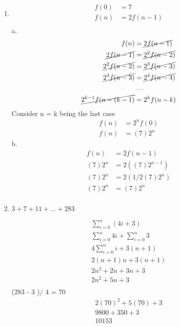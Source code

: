 \documentclass{article}
\begin{document}
\begin{enumerate}
  \item
    \begin{align*}
      f(0) &= 7 \\
      f(n) &= 2f(n - 1) \\
    \end{align*}
    a.
    \begin{align*}
    f(n) &= \cancel{2f(n-1)}\\
    \cancel{2f(n-1)} &= \cancel{2^2f(n-2)}\\
    \cancel{2^2f(n-2)} &= \cancel{2^3f(n-3)}\\
    \cancel{2^3f(n-3)} &= \cancel{2^4f(n-4)}\\
    &\ldots\\
    \cancel{2^{k-1}f(n-(k-1)} &= 2^{k}f(n-k)
  \end{align*}
  Consider n = k being the last case
  \begin{align*}
    f(n) &= 2^{n}f(0) \\
    f(n) &= (7)2^{n}
  \end{align*}
  b.
  \begin{align*}
    f(n) &= 2f(n - 1) \\
    (7)2^{n} &= 2((7)2^{n - 1}) \\
    (7)2^{n} &= 2(1/2(7)2^{n}) \\
    (7)2^{n} &= (7)2^{n} \\
  \end{align*}

  \item
  $3+7+11+ ... +283$

   \begin{align*}
    \sum_{i=0}^{n}(4i + 3) \\
    \sum_{i=0}^{n}4i + \sum_{i=0}^{n}3 \\
    4\sum_{i=0}^{n}i + 3(n + 1)\\
    2(n + 1)n + 3(n + 1) \\
    2n^2 + 2n + 3n + 3 \\
    2n^2 + 5n + 3 \\
  \end{align*}
  (283 - 3 )/ 4 = 70 \\
  \begin{align*}
    2(70)^2 + 5(70) + 3 \\
    9800 + 350 + 3 \\
    10153 \\
  \end{align*}
  

\end{enumerate}
\end{document}
